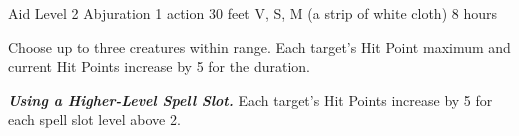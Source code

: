 \DndSpellHeader%
    {Aid}
    {Level 2 Abjuration}
    {1 action}
    {30 feet}
    {V, S, M (a strip of white cloth)}
    {8 hours}

Choose up to three creatures within range. Each target's Hit Point maximum and current Hit Points increase by 5 for the duration.

\textbf{\textit{Using a Higher-Level Spell Slot.}} Each target's Hit Points increase by 5 for each spell slot level above 2.
